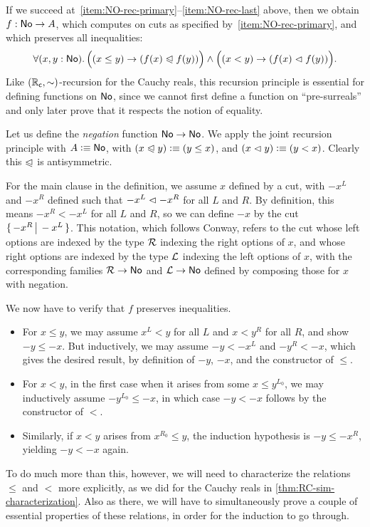 If we succeed at~\ref{item:NO-rec-primary}--\ref{item:NO-rec-last} above, then we obtain $f:\mathsf{No}\to A$, which computes on cuts as specified by~\ref{item:NO-rec-primary}, and which preserves all inequalities:
\[ \fall{x,y:\NO}\Big((x\le y) \to (f(x)\ble f(y))\Big) \land\Big((x< y) \to (f(x)\blt f(y))\Big).\]
Like $(\mathbb{R}_\mathsf{c},\mathord\sim)$-recursion for the Cauchy reals, this recursion principle is essential for defining functions on $\mathsf{No}$, since we cannot first define a function on ``pre-surreals'' and only later prove that it respects the notion of equality.

\begin{eg}
  Let us define the \emph{negation} function $\mathsf{No}\to\mathsf{No}$.
  We apply the joint recursion principle with $A\vcentcolon\equiv\mathsf{No}$, with $(x\trianglelefteqslant y)\vcentcolon\equiv (y\le x)$, and $(x\vartriangleleft y)\vcentcolon\equiv (y< x)$.
  Clearly this $\trianglelefteqslant$ is antisymmetric.

  For the main clause in the definition, we assume $x$ defined by a cut, with $-x^L$ and $-x^R$ defined such that $-x^L \vartriangleleft -x^R$ for all $L$ and $R$.
  By definition, this means $-x^R< -x^L$ for all $L$ and $R$, so we can define $-x$ by the cut $\{\,-x^R\,\big|\,-x^L\,\}$.
  This notation, which follows Conway, refers to the cut whose left options are indexed by the type $\mathcal{R}$ indexing the right options of $x$, and whose right options are indexed by the type $\mathcal{L}$ indexing the left options of $x$, with the corresponding families $\mathcal{R}\to\mathsf{No}$ and $\mathcal{L}\to\mathsf{No}$ defined by composing those for $x$ with negation.

  We now have to verify that $f$ preserves inequalities.
  \begin{itemize}
  \item For $x\le y$, we may assume $x^L<y$ for all $L$ and $x < y^R$ for all $R$, and show $-y\le -x$.
    But inductively, we may assume $-y <-x^L$ and $-y^R<-x$, which gives the desired result, by definition of $-y$, $-x$, and the constructor of $\le$.
  \item For $x<y$, in the first case when it arises from some $x\le y^{L_0}$, we may inductively assume $-y^{L_0} \le -x$, in which case $-y<-x$ follows by the constructor of $<$.
  \item Similarly, if $x<y$ arises from $x^{R_0}\le y$, the induction hypothesis is $-y \le -x^R$, yielding $-y<-x$ again.
  \end{itemize}
\end{eg}

To do much more than this, however, we will need to characterize the relations $\le$ and $<$ more explicitly, as we did for the Cauchy reals in \autoref{thm:RC-sim-characterization}.
Also as there, we will have to simultaneously prove a couple of essential properties of these relations, in order for the induction to go through.

